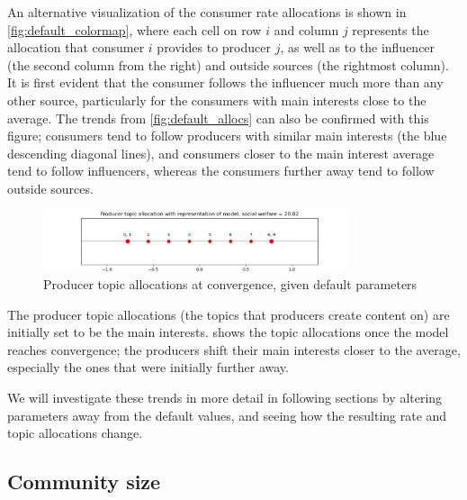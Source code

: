 \documentclass[11pt, letterpaper]{article}
\begin{document}
An alternative visualization of the consumer rate allocations is shown in \cref{fig:default_colormap}, where each cell on row \(i\) and column \(j\) represents the allocation that consumer \(i\) provides to producer \(j\), as well as to the influencer (the second column from the right) and outside sources (the rightmost column). It is first evident that the consumer follows the influencer much more than any other source, particularly for the consumers with main interests close to the average. The trends from \cref{fig:default_allocs} can also be confirmed with this figure; consumers tend to follow producers with similar main interests (the blue descending diagonal lines), and consumers closer to the main interest average tend to follow influencers, whereas the consumers further away tend to follow outside sources.

\begin{figure}[h]
    \centering
    \includegraphics[width=0.8\textwidth]{figures/default_topics.jpg}
    \caption{Producer topic allocations at convergence, given default parameters}
    \label{fig:default_topics}
\end{figure}

The producer topic allocations (the topics that producers create content on) are initially set to be the main interests.  shows the topic allocations once the model reaches convergence; the producers shift their main interests closer to the average, especially the ones that were initially further away.

We will investigate these trends in more detail in following sections by altering parameters away from the default values, and seeing how the resulting rate and topic allocations change.

\subsection{Community size}
\end{document}
